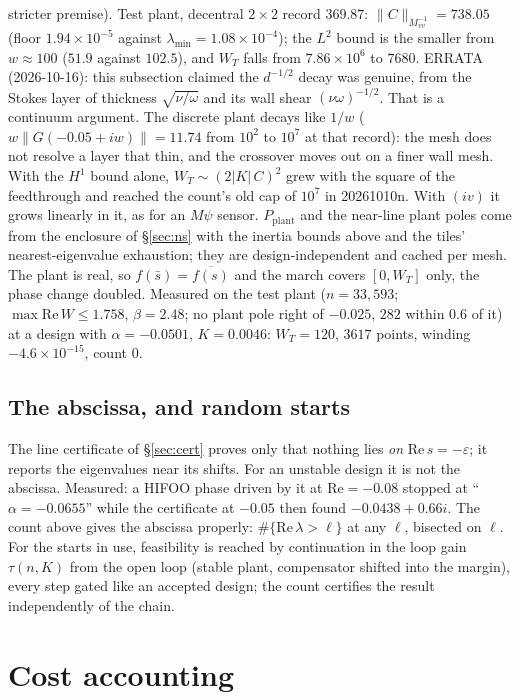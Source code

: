 \documentclass[11pt,a4paper]{article}
\newcommand{\eps}{\varepsilon}
\begin{document}
{stricter premise).  Test plant, decentral $2\times2$ record $369.87$: $\|C\|_{M_{vv}^{-1}}=738.05$
(floor $1.94\times10^{-5}$ against $\lambda_{\min}=1.08\times10^{-4}$); the $L^2$ bound is the
smaller from $w\approx100$ ($51.9$ against $102.5$), and $W_T$ falls from $7.86\times10^6$ to
$7680$.  ERRATA (2026-10-16): this subsection claimed the $d^{-1/2}$ decay was genuine, from the
Stokes layer of thickness $\sqrt{\nu/\omega}$ and its wall shear $(\nu\omega)^{-1/2}$.  That is a
continuum argument.  The discrete plant decays like $1/w$ ($w\|G(-0.05+iw)\|=11.74$ from $10^2$
to $10^7$ at that record): the mesh does not resolve a layer that thin, and the crossover moves
out on a finer wall mesh.  With the $H^1$ bound alone, $W_T\sim(2|K|\,C)^2$ grew with the square of
the feedthrough and reached the count's old cap of $10^7$ in 20261010n.  With $(iv)$ it grows
linearly in it, as for an $M\psi$ sensor.  $P_{\mathrm{plant}}$ and the near-line
plant poles come from the enclosure of \S\ref{sec:ns} with the inertia bounds above and the
tiles' nearest-eigenvalue exhaustion; they are design-independent and cached per mesh.
The plant is real, so $f(\bar s)=\overline{f(s)}$ and the march covers $[0,W_T]$ only, the phase
change doubled.  Measured on the test plant ($n=33{,}593$; $\max\mathrm{Re}\,W\le1.758$,
$\beta=2.48$; no plant pole right of $-0.025$, $282$ within $0.6$ of it) at a design with
$\alpha=-0.0501$, $K=0.0046$: $W_T=120$, $3617$ points, winding $-4.6\times10^{-15}$, count $0$.

\subsection{The abscissa, and random starts}
The line certificate of \S\ref{sec:cert} proves only that nothing lies \emph{on}
$\mathrm{Re}\,s=-\eps$; it reports the eigenvalues near its shifts.  For an unstable design it
is not the abscissa.  Measured: a HIFOO phase driven by it at $\mathrm{Re}=-0.08$ stopped at
``$\alpha=-0.0655$'' while the certificate at $-0.05$ then found $-0.0438+0.66i$.  The count
above gives the abscissa properly: $\#\{\mathrm{Re}\,\lambda>\ell\}$ at any $\ell$, bisected on
$\ell$.  For the starts in use, feasibility is reached by continuation in the loop gain
$\tau(n,K)$ from the open loop (stable plant, compensator shifted into the margin), every
step gated like an accepted design; the count certifies the result independently of the
chain.

\section{Cost accounting}\label{sec:cost}

}
\end{document}
